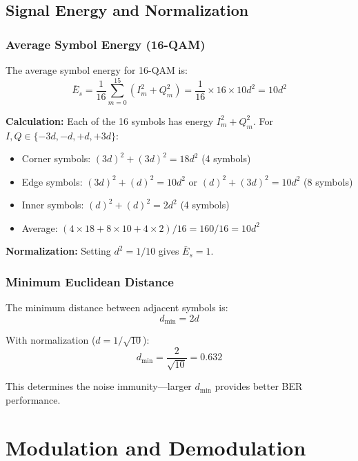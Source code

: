 \subsection{Signal Energy and Normalization}

\subsubsection{Average Symbol Energy (16-QAM)}

The average symbol energy for 16-QAM is:
\begin{equation}
\bar{E}_s = \frac{1}{16}\sum_{m=0}^{15} (I_m^2 + Q_m^2) = \frac{1}{16} \times 16 \times 10d^2 = 10d^2
\label{eq:qam16-energy}
\end{equation}

\textbf{Calculation:} Each of the 16 symbols has energy $I_m^2 + Q_m^2$. For $I, Q \in \{-3d, -d, +d, +3d\}$:
\begin{itemize}
\item Corner symbols: $(3d)^2 + (3d)^2 = 18d^2$ (4 symbols)
\item Edge symbols: $(3d)^2 + (d)^2 = 10d^2$ or $(d)^2 + (3d)^2 = 10d^2$ (8 symbols)
\item Inner symbols: $(d)^2 + (d)^2 = 2d^2$ (4 symbols)
\item Average: $(4 \times 18 + 8 \times 10 + 4 \times 2)/16 = 160/16 = 10d^2$
\end{itemize}

\textbf{Normalization:} Setting $d^2 = 1/10$ gives $\bar{E}_s = 1$.

\subsubsection{Minimum Euclidean Distance}

The minimum distance between adjacent symbols is:
\begin{equation}
d_{\min} = 2d
\label{eq:qam-dmin}
\end{equation}

With normalization ($d = 1/\sqrt{10}$):
\begin{equation}
d_{\min} = \frac{2}{\sqrt{10}} = 0.632
\end{equation}

This determines the noise immunity---larger $d_{\min}$ provides better BER performance.

\section{Modulation and Demodulation}

